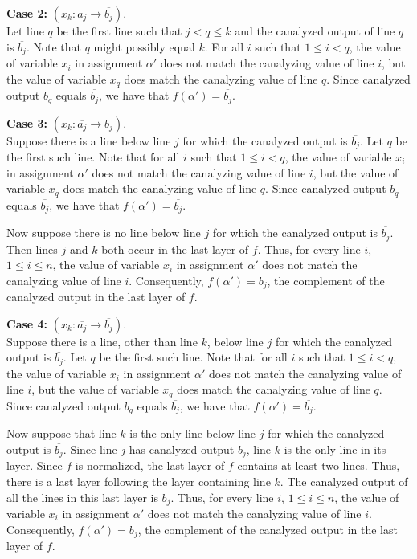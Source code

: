 \noindent
{\bf Case 2:} $(x_k : a_j \rightarrow \overline{b_j})$. \\ 

Let line
$q$ be the first line such that $j < q \leq k$ and the canalyzed
output of line $q$ is $\overline{b_j}$.  Note that $q$ might possibly
equal $k$.  For all $i$ such that $1 \leq i < q$, the value of
variable $x_i$ in assignment $\alpha'$ does not match the canalyzing
value of line $i$, but the value of variable $x_q$ does match the
canalyzing value of line $q$.  Since canalyzed output $b_q$ equals
$\overline{b_j}$, we have that $f(\alpha') = \overline{b_j}$.

\noindent
{\bf Case 3:} $(x_k : \overline{a_j} \rightarrow b_j)$. \\ 

Suppose there is a line below line $j$ for which the canalyzed output is
$\overline{b_j}$.  Let $q$ be the first such line.  Note that for
all $i$ such that $1 \leq i < q$, the value of variable $x_i$ in
assignment $\alpha'$ does not match the canalyzing value of line
$i$, but the value of variable $x_q$ does match the canalyzing value
of line $q$.  Since canalyzed output $b_q$ equals $\overline{b_j}$,
we have that $f(\alpha') = \overline{b_j}$.

Now suppose there is no line below line $j$ for which the canalyzed
output is $\overline{b_j}$.  Then lines $j$ and $k$ both occur in
the last layer of $f$.  Thus, for every line $i$, $1 \leq i \leq
n$, the value of variable $x_i$ in assignment $\alpha'$ does not
match the canalyzing value of line $i$.  Consequently, $f(\alpha')
= \overline{b_j}$, the complement of the canalyzed output in the
last layer of $f$.

\noindent
{\bf Case 4:} $(x_k : \overline{a_j} \rightarrow \overline{b_j})$.  \\ 
Suppose there is a line, other than line $k$, below line $j$ for
which the canalyzed output is $\overline{b_j}$.  Let $q$ be the
first such line.  Note that for all $i$ such that $1 \leq i < q$,
the value of variable $x_i$ in assignment $\alpha'$ does not match
the canalyzing value of line $i$, but the value of variable $x_q$
does match the canalyzing value of line $q$.  Since canalyzed output
$b_q$ equals $\overline{b_j}$, we have that $f(\alpha') =
\overline{b_j}$.

Now suppose that line $k$ is the only line below line $j$ for which
the canalyzed output is $\overline{b_j}$.  Since line $j$ has
canalyzed output $b_j$, line $k$ is the only line in its layer.
Since $f$ is normalized, the last layer of $f$ contains at least
two lines.  Thus, there is a last layer following the layer containing
line $k$.  The canalyzed output of all the lines in this last layer
is $b_j$.  Thus, for every line $i$, $1 \leq i \leq n$, the value
of variable $x_i$ in assignment $\alpha'$ does not match the
canalyzing value of line $i$.  Consequently, $f(\alpha') =
\overline{b_j}$, the complement of the canalyzed output in the last
layer of $f$.  \QED

